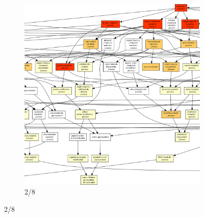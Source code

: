 \begin{figure}[p]
\ContinuedFloat
\begin{subfigure}{\textwidth}
\includegraphics[width=\textwidth]
{Figures/hlc-go-all-graph/hlc-go-all-graph_1.png}
\caption{2/8}
\end{subfigure}
\end{figure}

